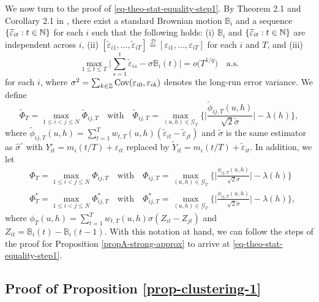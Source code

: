 \documentclass[a4paper,12pt]{article}
\begin{document}
We now turn to the proof of \eqref{eq-theo-stat-equality-step1}. By Theorem 2.1 and Corollary 2.1 in \cite{BerkesLiuWu2014}, there exist a standard Brownian motion $\mathbb{B}_i$ and a sequence $\{ \widetilde{\varepsilon}_{it}: t \in \mathbb{N} \}$ for each $i$ such that the following holds: (i) $\mathbb{B}_i$ and $\{ \widetilde{\varepsilon}_{it}: t \in \mathbb{N} \}$ are independent across $i$, (ii) $[\widetilde{\varepsilon}_{i1},\ldots,\widetilde{\varepsilon}_{iT}] \stackrel{\mathcal{D}}{=} [\varepsilon_{i1},\ldots,\varepsilon_{iT}]$ for each $i$ and $T$, and (iii)  
\begin{equation*}
\max_{1 \le t \le T} \Big| \sum\limits_{s=1}^t \widetilde{\varepsilon}_{is} - \sigma \mathbb{B}_i(t) \Big| = o\big( T^{1/q} \big) \quad \text{a.s.}  
\end{equation*}
for each $i$, where $\sigma^2 = \sum_{k \in \mathbb{Z}} \textnormal{Cov}(\varepsilon_{i0}, \varepsilon_{ik})$ denotes the long-run error variance. We define 
\[ \widetilde{\Phi}_T = \max_{1\le i < j \le N} \widetilde{\Phi}_{ij,T} \quad \text{with} \quad \widetilde{\Phi}_{ij,T} = \max_{(u,h) \in \mathcal{G}_T} \Big\{ \Big|\frac{\widetilde{\phi}_{ij,T}(u,h)}{\sqrt{2}\widetilde{\sigma}}\Big| - \lambda(h) \Big\}, \]
where $\widetilde{\phi}_{ij,T}(u,h) = \sum\nolimits_{t=1}^T w_{t,T}(u,h) (\widetilde{\varepsilon}_{it} - \widetilde{\varepsilon}_{jt})$ and $\widetilde{\sigma}$ is the same estimator as $\widehat{\sigma}^\circ$ with $Y_{it}^\circ = m_i(t/T) + \varepsilon_{it}$ replaced by  $\widetilde{Y}_{it} = m_i(t/T) + \widetilde{\varepsilon}_{it}$. In addition, we let 
\begin{align*} 
 & \Phi_T = \max_{1\le i < j \le N} \Phi_{ij,T} \quad \text{with} \quad \Phi_{ij,T} = \max_{(u,h) \in \mathcal{G}_T} \Big\{ \Big|\frac{\phi_{ij,T}(u,h)}{\sqrt{2}\sigma}\Big| - \lambda(h) \Big\} \\
 & \Phi_T^* = \max_{1\le i < j \le N} \Phi_{ij,T}^* \quad \text{with} \quad \Phi_{ij,T}^* = \max_{(u,h) \in \mathcal{G}_T} \Big\{ \Big|\frac{\phi_{ij,T}(u,h)}{\sqrt{2}\widetilde{\sigma}}\Big| - \lambda(h) \Big\}, 
\end{align*}
where $\phi_T(u,h) = \sum\nolimits_{t=1}^T w_{t,T}(u,h) \sigma (Z_{it} - Z_{jt})$ and $Z_{it} = \mathbb{B}_i(t) - \mathbb{B}_i(t-1)$. With this notation at hand, we can follow the steps of the proof for Proposition \ref{propA-strong-approx} to arrive at \eqref{eq-theo-stat-equality-step1}. 



\subsection*{Proof of Proposition \ref{prop-clustering-1}}
\end{document}
